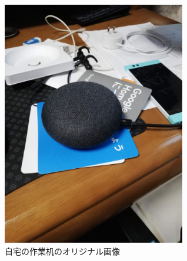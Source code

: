 \documentclass[11pt,a4j]{jsarticle}
\begin{document}
    \begin{figure}[H]
        \centering
        \includegraphics[clip,width=80mm]{img/mydesk.jpg}
        \caption{自宅の作業机のオリジナル画像\label{fig:mydesk}}
    \end{figure} 
\end{document}
